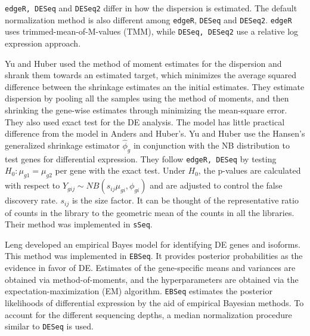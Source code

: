 {\tt edgeR, DESeq} and {\tt DESeq2} differ in how the dispersion is estimated. The default normalization method is also different among {\tt edgeR}, {\tt DESeq} and {\tt DESeq2}. {\tt edgeR} uses trimmed-mean-of-M-values (TMM), while {\tt DESeq, DESeq2} use a relative log expression approach. 


Yu and Huber used the method of moment estimates for the dispersion and shrank them towards an estimated target, which minimizes the average squared difference between the shrinkage estimates an the initial estimates. They estimate dispersion by pooling all the samples using the method of moments, and then shrinking the gene-wise estimates through minimizing the mean-square error. They also used exact test for the DE analysis. The model has little practical difference from the model in Anders and Huber's. Yu and Huber use the Hansen's generalized shrinkage estimator $\hat{\phi}_g$ in conjunction with the NB distribution to test genes for differential expression. They follow {\tt edgeR, DESeq} by testing $H_{0}: \mu_{g1} = \mu_{g2}$ per gene with the exact test. Under $H_{0}$, the p-values are calculated with respect to $Y_{gij} {\sim} NB(s_{ij}\mu_{gi}, \phi_{gi})$ and are adjusted to control the false discovery rate\citep{yu2013sseq}. $s_{ij}$ is the size factor. It can be thought of the representative ratio of counts in the library to the geometric mean of the counts in all the libraries. Their method was implemented in {\tt sSeq}.


Leng developed an empirical Bayes model for identifying DE genes and isoforms. This method was implemented in {\tt EBSeq}. It provides posterior probabilities as the evidence in favor of DE. Estimates of the gene-specific means and variances are obtained via method-of-moments, and the hyperparameters are obtained via the expectation-maximization (EM) algorithm\citep{leng2013ebseq}. {\tt EBSeq} estimates the posterior likelihoods of differential expression by the aid of empirical Bayesian methods. To account for the different sequencing depths, a median normalization procedure similar to {\tt DESeq} is used. 